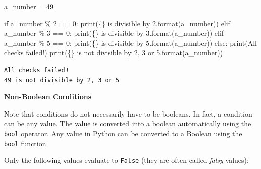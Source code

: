 \documentclass[
  letterpaper,
  DIV=11,
  numbers=noendperiod]{scrreprt}
\newenvironment{Shaded}{\begin{snugshade}}{\end{snugshade}}
\newcommand{\BuiltInTok}[1]{\textcolor[rgb]{0.00,0.23,0.31}{#1}}
\newcommand{\ControlFlowTok}[1]{\textcolor[rgb]{0.00,0.23,0.31}{#1}}
\newcommand{\DecValTok}[1]{\textcolor[rgb]{0.68,0.00,0.00}{#1}}
\newcommand{\NormalTok}[1]{\textcolor[rgb]{0.00,0.23,0.31}{#1}}
\newcommand{\OperatorTok}[1]{\textcolor[rgb]{0.37,0.37,0.37}{#1}}
\newcommand{\SpecialCharTok}[1]{\textcolor[rgb]{0.37,0.37,0.37}{#1}}
\newcommand{\StringTok}[1]{\textcolor[rgb]{0.13,0.47,0.30}{#1}}
\begin{document}
\begin{Shaded}
\begin{Highlighting}[]
\NormalTok{a\_number }\OperatorTok{=} \DecValTok{49}
\end{Highlighting}
\end{Shaded}

\begin{Shaded}
\begin{Highlighting}[]
\ControlFlowTok{if}\NormalTok{ a\_number }\OperatorTok{\%} \DecValTok{2} \OperatorTok{==} \DecValTok{0}\NormalTok{:}
    \BuiltInTok{print}\NormalTok{(}\StringTok{\textquotesingle{}}\SpecialCharTok{\{\}}\StringTok{ is divisible by 2\textquotesingle{}}\NormalTok{.}\BuiltInTok{format}\NormalTok{(a\_number))}
\ControlFlowTok{elif}\NormalTok{ a\_number }\OperatorTok{\%} \DecValTok{3} \OperatorTok{==} \DecValTok{0}\NormalTok{:}
    \BuiltInTok{print}\NormalTok{(}\StringTok{\textquotesingle{}}\SpecialCharTok{\{\}}\StringTok{ is divisible by 3\textquotesingle{}}\NormalTok{.}\BuiltInTok{format}\NormalTok{(a\_number))}
\ControlFlowTok{elif}\NormalTok{ a\_number }\OperatorTok{\%} \DecValTok{5} \OperatorTok{==} \DecValTok{0}\NormalTok{:}
    \BuiltInTok{print}\NormalTok{(}\StringTok{\textquotesingle{}}\SpecialCharTok{\{\}}\StringTok{ is divisible by 5\textquotesingle{}}\NormalTok{.}\BuiltInTok{format}\NormalTok{(a\_number))}
\ControlFlowTok{else}\NormalTok{:}
    \BuiltInTok{print}\NormalTok{(}\StringTok{\textquotesingle{}All checks failed!\textquotesingle{}}\NormalTok{)}
    \BuiltInTok{print}\NormalTok{(}\StringTok{\textquotesingle{}}\SpecialCharTok{\{\}}\StringTok{ is not divisible by 2, 3 or 5\textquotesingle{}}\NormalTok{.}\BuiltInTok{format}\NormalTok{(a\_number))}
\end{Highlighting}
\end{Shaded}

\begin{verbatim}
All checks failed!
49 is not divisible by 2, 3 or 5
\end{verbatim}

\textbf{Non-Boolean Conditions}

Note that conditions do not necessarily have to be booleans. In fact, a
condition can be any value. The value is converted into a boolean
automatically using the \texttt{bool} operator. Any value in Python can
be converted to a Boolean using the \texttt{bool} function.

Only the following values evaluate to \texttt{False} (they are often
called \emph{falsy} values):
\end{document}
